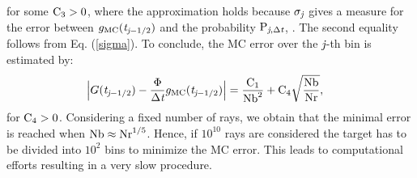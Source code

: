 for some $\textrm{C}_3>0$, where the approximation holds because $\sigma_{\textit{j}}$ gives a measure for the error between 
$g_{\textrm{MC}}(\textit{t}_{\textit{j}-1/2})$ and the probability $\textrm{P}_{\textit{j}, \Delta\textit{t}}$, \cite{Diez}. The second equality follows from Eq. (\ref{sigma}). To conclude, the MC error over the $\textit{j}$-th bin is estimated by:
\begin{equation} \begin{aligned}
\Big|G(\textit{t}_{\textit{j}-1/2})&-\frac{\Phi}
{\Delta\textit{t}}g_{\textrm{MC}}(\textit{t}_{\textit{j}-1/2})\Big| =
\frac{\textrm{C}_1}{\textrm{Nb}^2} + \textrm{C}_4\sqrt{\frac{\textrm{Nb}}{\textrm{Nr}}},
\end{aligned}
\end{equation}
for $\textrm{C}_4>0$.
Considering a fixed number of rays, we obtain that the minimal error is reached when $\textrm{Nb}\approx \textrm{Nr}^{1/5}$.
Hence, if $10^{10}$ rays are considered the target has to be divided into $10^2$ bins to minimize the MC error.
This leads to computational efforts resulting in a very slow procedure.





